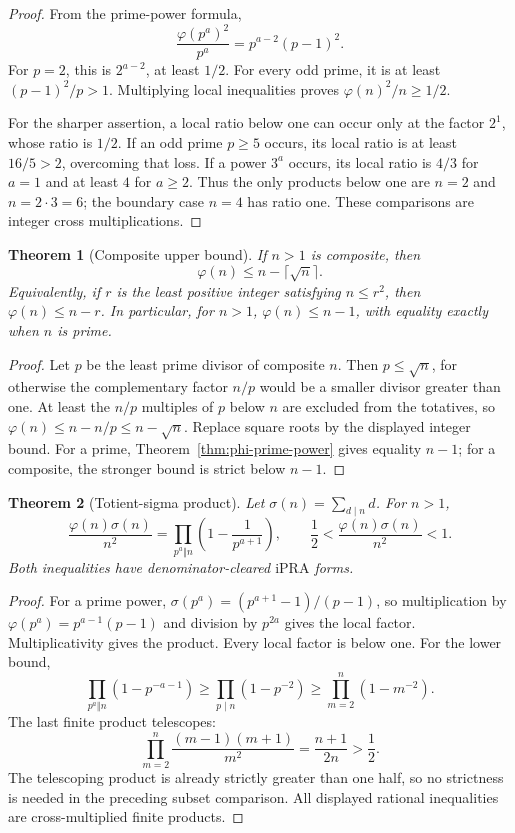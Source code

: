 \documentclass[11pt]{article}
\newtheorem{theorem}{Theorem}[section]
\theoremstyle{definition}
\newcommand{\ipra}{\mathrm{iPRA}}
\begin{document}
\begin{proof}
From the prime-power formula,
\[
 \frac{\varphi(p^a)^2}{p^a}=p^{a-2}(p-1)^2.
\]
For \(p=2\), this is \(2^{a-2}\), at least \(1/2\).  For every odd prime,
it is at least \((p-1)^2/p>1\).  Multiplying local inequalities proves
\(\varphi(n)^2/n\ge1/2\).

For the sharper assertion, a local ratio below one can occur only at the
factor \(2^1\), whose ratio is \(1/2\).  If an odd prime \(p\ge5\) occurs, its
local ratio is at least \(16/5>2\), overcoming that loss.  If a power
\(3^a\) occurs, its local ratio is \(4/3\) for \(a=1\) and at least \(4\)
for \(a\ge2\).  Thus the only products below one are \(n=2\) and
\(n=2\cdot3=6\); the boundary case \(n=4\) has ratio one.  These comparisons
are integer cross multiplications.
\end{proof}

\begin{theorem}[Composite upper bound]\label{thm:phi-upper-composite}
If \(n>1\) is composite, then
\[
 \boxed{\varphi(n)\le n-\lceil\sqrt n\rceil}.
\]
Equivalently, if \(r\) is the least positive integer satisfying \(n\le r^2\),
then \(\varphi(n)\le n-r\).  In particular, for \(n>1\),
\(\varphi(n)\le n-1\), with equality exactly when \(n\) is prime.
\end{theorem}

\begin{proof}
Let \(p\) be the least prime divisor of composite \(n\).  Then
\(p\le\sqrt n\), for otherwise the complementary factor \(n/p\) would be a
smaller divisor greater than one.  At least the \(n/p\) multiples of \(p\)
below \(n\) are excluded from the totatives, so
\(\varphi(n)\le n-n/p\le n-\sqrt n\).  Replace square roots by the displayed
integer bound.  For a prime, Theorem~\ref{thm:phi-prime-power} gives equality
\(n-1\); for a composite, the stronger bound is strict below \(n-1\).
\end{proof}

\begin{theorem}[Totient-sigma product]\label{thm:phi-sigma}
Let \(\sigma(n)=\sum_{d\mid n}d\).  For \(n>1\),
\[
 \boxed{\displaystyle
 \frac{\varphi(n)\sigma(n)}{n^2}
 =\prod_{p^a\Vert n}\left(1-\frac1{p^{a+1}}\right),
 \qquad
 \frac12<\frac{\varphi(n)\sigma(n)}{n^2}<1.}
\]
Both inequalities have denominator-cleared \(\ipra\) forms.
\end{theorem}

\begin{proof}
For a prime power,
\(
 \sigma(p^a)=(p^{a+1}-1)/(p-1)
\), so multiplication by
\(\varphi(p^a)=p^{a-1}(p-1)\) and division by \(p^{2a}\) gives the local
factor.  Multiplicativity gives the product.  Every local factor is below one.
For the lower bound,
\[
 \prod_{p^a\Vert n}\left(1-p^{-a-1}\right)
 \ge\prod_{p\mid n}(1-p^{-2})
 \ge\prod_{m=2}^{n}(1-m^{-2}).
\]
The last finite product telescopes:
\[
 \prod_{m=2}^{n}\frac{(m-1)(m+1)}{m^2}
 =\frac{n+1}{2n}>\frac12.
\]
The telescoping product is already strictly greater than one half, so no
strictness is needed in the preceding subset comparison.  All displayed
rational inequalities are cross-multiplied finite products.
\end{proof}
\end{document}
